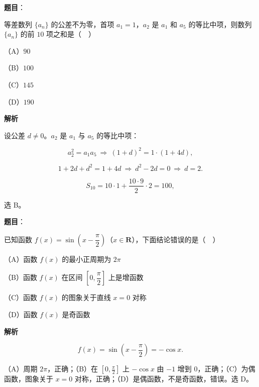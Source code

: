 \begin{answer}

\textbf{题目}：

等差数列 $\{a_n\}$ 的公差不为零，首项 $a_1=1$，$a_2$ 是 $a_1$ 和 $a_5$ 的等比中项，则数列 $\{a_n\}$ 的前 $10$ 项之和是（　）

（A）$90$

（B）$100$

（C）$145$

（D）$190$

\textbf{解析}

设公差 $d\neq0$。$a_2$ 是 $a_1$ 与 $a_5$ 的等比中项：

\nopagebreak[4]
\[a_2^2=a_1a_5\ \Longrightarrow\ (1+d)^2=1\cdot(1+4d),\]

\nopagebreak[4]
\[1+2d+d^2=1+4d\ \Longrightarrow\ d^2-2d=0\ \Longrightarrow\ d=2 .\]

\nopagebreak[4]
\[S_{10}=10\cdot1+\frac{10\cdot9}{2}\cdot2=100,\]

选 B。


\end{answer}
\begin{answer}

\textbf{题目}：

已知函数 $f(x)=\sin\left(x-\dfrac{\pi}{2}\right)$（$x\in\mathbf R$），下面结论错误的是（　）

（A）函数 $f(x)$ 的最小正周期为 $2\pi$

（B）函数 $f(x)$ 在区间 $\left[0,\dfrac{\pi}{2}\right]$ 上是增函数

（C）函数 $f(x)$ 的图象关于直线 $x=0$ 对称

（D）函数 $f(x)$ 是奇函数

\textbf{解析}

\nopagebreak[4]
\[f(x)=\sin\left(x-\frac\pi2\right)=-\cos x .\]

（A）周期 $2\pi$，正确；（B）在 $\left[0,\frac\pi2\right]$ 上 $-\cos x$ 由 $-1$ 增到 $0$，正确；（C）为偶函数，图象关于 $x=0$ 对称，正确；（D）是偶函数，不是奇函数，错误。选 D。


\end{answer}
